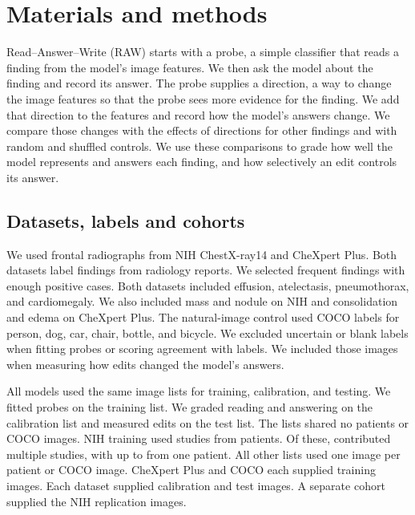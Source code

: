 \section{Materials and methods}
\label{sec:framework}
\label{app:campaign}

Read--Answer--Write (RAW) starts with a probe, a simple classifier that reads a finding from the model's image features. We then ask the model about the finding and record its answer. The probe supplies a direction, a way to change the image features so that the probe sees more evidence for the finding. We add that direction to the features and record how the model's answers change. We compare those changes with the effects of directions for other findings and with random and shuffled controls. We use these comparisons to grade how well the model represents and answers each finding, and how selectively an edit controls its answer.

\subsection{Datasets, labels and cohorts}
\label{sec:setup}
\label{app:cf-labels}
\label{app:repro-cohorts}

We used frontal radiographs from NIH ChestX-ray14 and CheXpert Plus. Both datasets label findings from radiology reports.\cite{wang2017chestxray,chambon2024chexpertplus,irvin2019chexpert} We selected frequent findings with enough positive cases. Both datasets included effusion, atelectasis, pneumothorax, and cardiomegaly. We also included mass and nodule on NIH and consolidation and edema on CheXpert Plus. The natural-image control used COCO labels for person, dog, car, chair, bottle, and bicycle.\cite{lin2014coco} We excluded uncertain or blank labels when fitting probes or scoring agreement with labels. We included those images when measuring how edits changed the model's answers.

All models used the same image lists for training, calibration, and testing. We fitted probes on the training list. We graded reading and answering on the calibration list and measured edits on the test list. The lists shared no patients or COCO images. NIH training used \cfCohortNihTrainRows{} studies from \cfCohortNihTrainUnits{} patients. Of these, \cfCohortNihTrainMulti{} contributed multiple studies, with up to \cfCohortNihTrainMax{} from one patient. All other lists used one image per patient or COCO image. CheXpert Plus and COCO each supplied \cfCohortChexTrainRows{} training images. Each dataset supplied \cfCohortNihCalibrationRows{} calibration and \cfCohortNihTestRows{} test images. A separate cohort supplied the NIH replication images.

